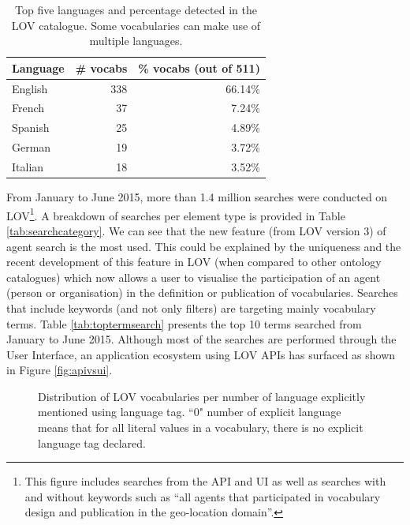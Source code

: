 \documentclass{iosart2c}
\begin{document}
 \begin{table}[h!tb]
\caption{Top five languages and percentage detected in the LOV catalogue. Some vocabularies can make use of multiple languages.}
\begin{tabular}{lrr}
\hline
\textbf{Language} & \textbf{\# vocabs} & \textbf{\% vocabs (out of 511)}  \\ \hline
English & 338 & 66.14\%      \\
French & 37 & 7.24\%      \\
Spanish & 25 & 4.89\%      \\
German & 19 & 3.72\%      \\
Italian & 18 & 3.52\%      \\
\hline  
\end{tabular}
\label{tab:language}
\end{table}


From January to June 2015, more than 1.4 million searches were conducted on LOV\footnote{This figure includes searches from the API and UI as well as searches with and without keywords such as ``all agents that participated in vocabulary design and publication in the geo-location domain''.}. A breakdown of searches per element type is provided in Table \ref{tab:searchcategory}. We can see that the new feature (from LOV version 3) of agent search is the most used. This could be explained by the uniqueness and the recent development of this feature in LOV (when compared to other ontology catalogues) which now allows a user to visualise the participation of an agent (person or organisation) in the definition or publication of vocabularies. Searches that include keywords (and not only filters) are targeting mainly vocabulary terms. Table \ref{tab:toptermsearch} presents the top 10 terms searched from January to June 2015. Although most of the searches are performed through the User Interface, an application ecosystem using LOV APIs has surfaced as shown in Figure \ref{fig:apivsui}. 

\begin{figure}[htb]
\resizebox{\linewidth}{!}{}
\caption{\label{fig:langdist} Distribution of LOV vocabularies per number of language explicitly mentioned using language tag. ``0" number of explicit language means that for all literal values in a vocabulary, there is no explicit language tag declared.}
\end{figure}
\end{document}
